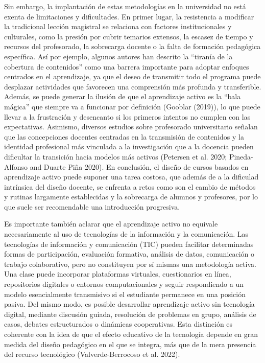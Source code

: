 \documentclass[
  11pt,
  a4paper,
  twoside]{scrreprt}
\begin{document}
Sin embargo, la implantación de estas metodologías en la universidad no
está exenta de limitaciones y dificultades. En primer lugar, la
resistencia a modificar la tradicional lección magistral se relaciona
con factores institucionales y culturales, como la presión por cubrir
temarios extensos, la escasez de tiempo y recursos del profesorado, la
sobrecarga docente o la falta de formación pedagógica específica. Así
por ejemplo, algunos autores han descrito la ``tiranía de la cobertura
de contenidos'' como una barrera importante para adoptar enfoques
centrados en el aprendizaje, ya que el deseo de transmitir todo el
programa puede desplazar actividades que favorecen una comprensión más
profunda y transferible. Además, se puede generar la ilusión de que el
aprendizaje activo es la ``bala mágica'' que siempre va a funcionar por
definición (Gooblar (2019)), lo que puede llevar a la frustración y
desencanto si los primeros intentos no cumplen con las expectativas.
Asimismo, diversos estudios sobre profesorado universitario señalan que
las concepciones docentes centradas en la transmisión de contenidos y la
identidad profesional más vinculada a la investigación que a la docencia
pueden dificultar la transición hacia modelos más activos (Petersen et
al. 2020; Pineda-Alfonso and Duarte Piña 2020). En conclusión, el diseño
de cursos basados en aprendizaje activo puede suponer una tarea costosa,
que además de a la dificulad intrínsica del diseño docente, se enfrenta
a retos como son el cambio de métodos y rutinas largamente establecidas
y la sobrecarga de alumnos y profesores, por lo que suele ser
recomendable una introducción progresiva.

Es importante también aclarar que el aprendizaje activo no equivale
necesariamente al uso de tecnologías de la información y la
comunicación. Las tecnologías de información y comunicación (TIC) pueden
facilitar determinadas formas de participación, evaluación formativa,
análisis de datos, comunicación o trabajo colaborativo, pero no
constituyen por sí mismas una metodología activa. Una clase puede
incorporar plataformas virtuales, cuestionarios en línea, repositorios
digitales o entornos computacionales y seguir respondiendo a un modelo
esencialmente transmisivo si el estudiante permanece en una posición
pasiva. Del mismo modo, es posible desarrollar aprendizaje activo sin
tecnología digital, mediante discusión guiada, resolución de problemas
en grupo, análisis de casos, debates estructurados o dinámicas
cooperativas. Esta distinción es coherente con la idea de que el efecto
educativo de la tecnología depende en gran medida del diseño pedagógico
en el que se integra, más que de la mera presencia del recurso
tecnológico (Valverde-Berrocoso et al. 2022).
\end{document}
